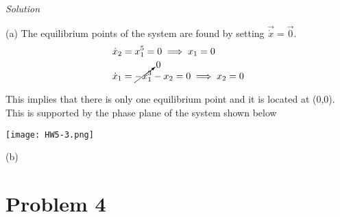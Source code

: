 \documentclass{article}
\begin{document}
  \noindent \textit{Solution} \newline \newline

  (a) The equilibrium points of the system are found by setting
  $\vec{\dot{x}}=\vec{0}$.
  \begin{align*}
    \dot{x}_2 &= x_1^5 = 0 \implies x_1=0 \\
    \dot{x}_1 &= \cancelto{0}{-x_1^3} - x_2 = 0 \implies x_2=0
  \end{align*}

  This implies that there is only one equilibrium point and it is located at
  (0,0). This is supported by the phase plane of the system shown below \newline

  \begin{center}
    \texttt{[image: HW5-3.png]}
  \end{center}

  (b) 

  \newpage

  \section{Problem 4}
\end{document}
